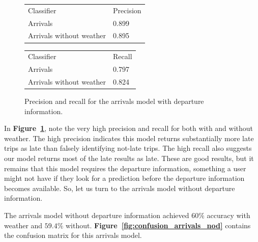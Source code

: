 \documentclass[11pt]{article} %
\begin{document}
\begin{figure}
    \begin{tabular}{ll}
         Classifier & Precision\\
         Arrivals & 0.899\\
         Arrivals without weather & 0.895\\
    \end{tabular}
    
    \begin{tabular}{ll}
         Classifier & Recall\\
         Arrivals & 0.797\\
         Arrivals without weather & 0.824\\
    \end{tabular}
    \caption{Precision and recall for the arrivals model with departure 
    information.}
    \label{fig:pr_arrivals}
\end{figure}

In \textbf{Figure~\ref{fig:pr_arrivals}}, note the very high precision and 
recall for both with and without weather.  The high precision indicates this
model returns substantially more late trips as late than falsely identifying
not-late trips. The high recall also suggests our model returns most of
the late results as late. These are good results, but it remains that this
model requires the departure information, something a user might not have if they
look for a prediction before the departure information becomes available. So, let
us turn to the arrivals model without departure information.

The arrivals model without departure information achieved $60\%$ accuracy with
weather and $59.4\%$ without.  \textbf{Figure~\ref{fig:confusion_arrivals_nod}}
contains the confusion matrix for this arrivals model.
\end{document}
